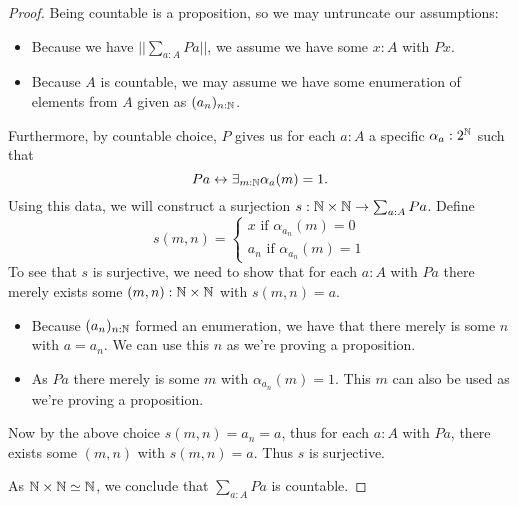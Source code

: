 \begin{proof}
  Being countable is a proposition, so we may untruncate our assumptions:
  \begin{itemize}
    \item 
      Because we have $||\sum_{a:A} P a||$, we assume we have  some $x:A$ with $P x$. 
    \item 
      Because $A$ is countable, we may assume we have some 
      enumeration of elements from $A$ given as $(a_n)_{n:\mathbb{N}}$.
  \end{itemize}
  Furthermore, by countable choice, $P$ gives us 
  for each $a:A$ a specific $\alpha_a:2^{\mathbb{N}}$ 
  such that 
  \begin{equation}
    P a \leftrightarrow \exists_{m:\mathbb{N}} \alpha_a(m) = 1.
  \end{equation}
  Using this data, we will 
  construct a surjection $s:\mathbb{N} \times \mathbb{N} \to \sum_{a:A} P a$. 
  Define 
  \begin{equation}
    s(m,n) = 
    \begin{cases}
      x \text{ if } \alpha_{a_n}(m) = 0 \\
      a_n \text{ if } \alpha_{a_n}(m) = 1
    \end{cases}
  \end{equation}
  To see that $s$ is surjective, we need to show that for each $a:A$ with $P a$ there 
  merely exists some $(m,n):\mathbb{N} \times \mathbb{N}$ 
  with $s(m,n) = a$. 
  \begin{itemize}
    \item 
  Because $(a_n)_{n:\mathbb{N}}$ formed an enumeration, we have that 
  there merely is some $n$ with $a = a_n$. 
  We can use this $n$ as we're proving a proposition. 
    \item 
  As $P a$ there merely is some $m$ with $\alpha_{a_n}(m) = 1$. 
  This $m$ can also be used as we're proving a proposition. 
  \end{itemize}
  Now by the above choice $s(m,n) = a_n = a$, 
  thus for each $a:A$ with $P a$, there exists some $(m,n)$ with 
  $s(m,n) = a$. Thus $s$ is surjective. 

  As $\mathbb{N} \times \mathbb{N} \simeq \mathbb{N}$, we conclude that 
  $\sum_{a:A} P a$ is countable. 
\end{proof}
